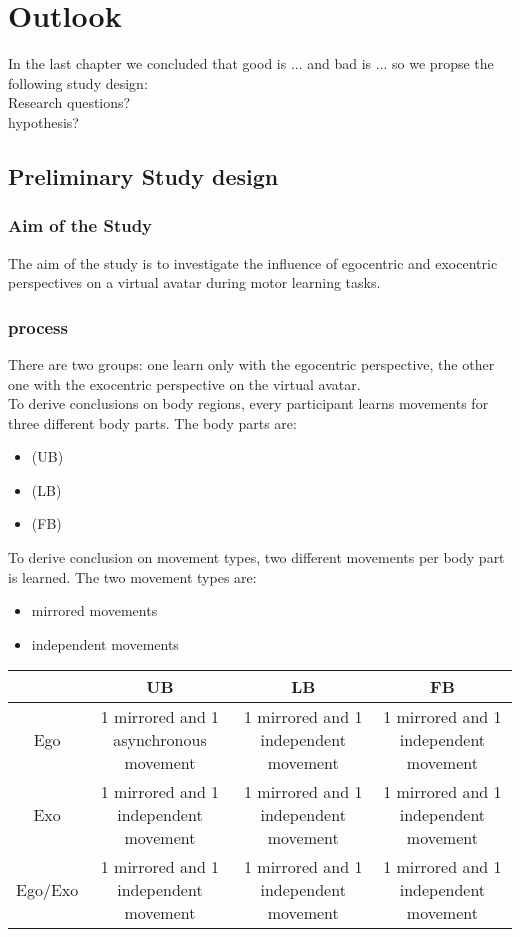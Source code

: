 \chapter{Outlook}
In the last chapter we concluded that good is ... and bad is ... so we propse the following study design:\\
Research questions?\\
hypothesis? \todo
\section{Preliminary Study design}

\subsection{Aim of the Study}
The aim of the study is to investigate the influence of egocentric and exocentric perspectives on a virtual avatar during motor learning tasks.

\subsection{process}
There are two groups: one learn only with the egocentric perspective, the other one with the exocentric perspective on the virtual avatar.\\
To derive conclusions on body regions, every participant learns movements for three different body parts. The body parts are:
\begin{itemize}
	\item \UB (UB)
	\item \LB (LB)
	\item \FB (FB)
\end{itemize}
To derive conclusion on movement types, two different movements per body part is learned. The two movement types are:
\begin{itemize}
	\item mirrored movements
	\item independent movements
\end{itemize}

\begin{center}
	\begin{tabular}{ | c | c | c | c | }
		\hline
		& UB & LB & FB \\ \hline 
		Ego & \parbox{4cm}{1 mirrored and 1 asynchronous movement} & \parbox{4cm}{1 mirrored and 1 independent movement} & \parbox{4cm}{1 mirrored and 1 independent movement} \\ \hline 
		Exo & \parbox{4cm}{1 mirrored and 1 independent movement} & \parbox{4cm}{1 mirrored and 1 independent movement} & \parbox{4cm}{1 mirrored and 1 independent movement} \\ \hline
		Ego/Exo & \parbox{4cm}{1 mirrored and 1 independent movement} & \parbox{4cm}{1 mirrored and 1 independent movement} & \parbox{4cm}{1 mirrored and 1 independent movement} \\
		\hline
	\end{tabular}
	\label{table:studyDesign}
\end{center}

